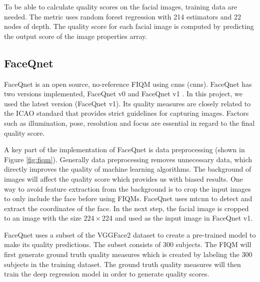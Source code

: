 To be able to calculate quality scores on the facial images, training data are needed. The metric uses random forest regression \cite{RandomForestRegressor} with 214 estimators and 22 nodes of depth. The quality score for each facial image is computed by predicting the output score of the image properties array.  

\subsection{FaceQnet}
FaceQnet \cite{FaceQnet} is an open source, no-reference FIQM using \acrlong{cnn}s (\acrshort{cnn}s). FaceQnet has two versions implemented, FaceQnet v0 \cite{hernandezortega2019faceqnet} and FaceQnet v1 \cite{hernandezortega2021biometric}. In this project, we used the latest version (FaceQnet v1). Its quality measures are closely related to the ICAO standard \cite{ICAO2} that provides strict guidelines for capturing images. Factors such as illumination, pose, resolution and focus are essential in regard to the final quality score.

A key part of the implementation of FaceQnet is data preprocessing (shown in Figure \ref{fig:fiqm}). Generally data preprocessing removes unnecessary data, which directly improves the quality of machine learning algorithms. The background of images will affect the quality score which provides us with biased results. One way to avoid feature extraction from the background is to crop the input images to only include the face before using FIQMs. FaceQnet uses \acrfull{mtcnn} to detect and extract the coordinates of the face. In the next step, the facial image is cropped to an image with the size $224 \times $224 and used as the input image in FaceQnet v1. 

FaceQnet uses a subset of the VGGFace2 \cite{VGGFace2} dataset to create a pre-trained model to make its quality predictions. The subset consists of 300 subjects. The FIQM will first generate ground truth quality measures which is created by labeling the 300 subjects in the training dataset. The ground truth quality measures will then train the deep regression model in order to generate quality scores. 

